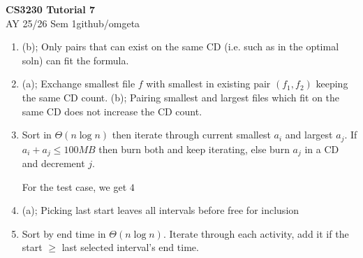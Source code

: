 \documentclass[12pt, a4paper]{article}
\newcommand{\mytitle}{CS3230 Tutorial 7}
\newcommand{\myauthor}{github/omgeta}
\newcommand{\mydate}{AY 25/26 Sem 1}
\begin{document}
\raggedright
\footnotesize
\begin{center}
{\normalsize{\textbf{\mytitle}}} \\
{\footnotesize{\mydate\hspace{2pt}\textemdash\hspace{2pt}\myauthor}}
\end{center}
\begin{enumerate}[Q\arabic*).]
  \item (b); Only pairs that can exist on the same CD (i.e. such as in the optimal soln) can fit the formula.

  \item (a); Exchange smallest file $f$ with smallest in existing pair $(f_1, f_2)$ keeping the same CD count. 
    (b); Pairing smallest and largest files which fit on the same CD does not increase the CD count. 

  \item Sort in $\Theta(n\log n)$ then iterate through current smallest $a_i$ and largest $a_j$. If $a_i+a_j \leq 100MB$ then burn both and keep iterating, else burn $a_j$ in a CD and decrement $j$. 

    For the test case, we get $4$

  \item (a); Picking last start leaves all intervals before free for inclusion 

  \item Sort by end time in $\Theta(n\log n)$. Iterate through each activity, add it if the start $\geq$ last selected interval's end time.
\end{enumerate}
\end{document}
